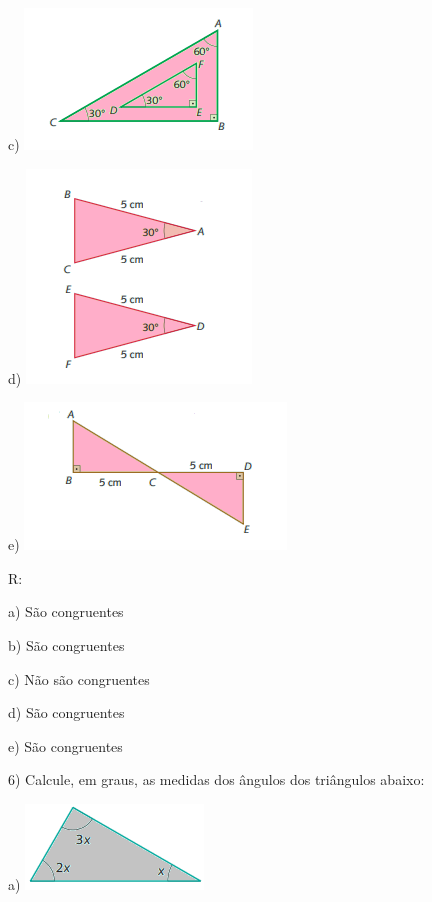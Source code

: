 c)
\includegraphics[width=2.38542in,height=1.47917in]{./imgSAEB_8_MAT/media/image21.png}

d)
\includegraphics[width=2.35417in,height=2.23958in]{./imgSAEB_8_MAT/media/image22.png}

e)
\includegraphics[width=2.73958in,height=1.54167in]{./imgSAEB_8_MAT/media/image23.png}

R:

a) São congruentes

b) São congruentes

c) Não são congruentes

d) São congruentes

e) São congruentes

6) Calcule, em graus, as medidas dos ângulos dos triângulos abaixo:

a)
\includegraphics[width=1.86458in,height=0.89583in]{./imgSAEB_8_MAT/media/image24.png}

